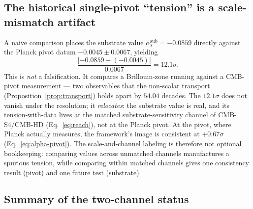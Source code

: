 \documentclass[12pt]{article}
\theoremstyle{definition}
\theoremstyle{remark}
\begin{document}
\subsection{The historical single-pivot ``tension'' is a scale-mismatch artifact}\label{sec:artifact}

A naive comparison places the substrate value $\alpha_s^{\mathrm{sub}} = -0.0859$ directly against the Planck pivot datum $-0.0045 \pm 0.0067$, yielding
\begin{equation}\label{eq:artifact}
  \frac{|-0.0859 - (-0.0045)|}{0.0067} = 12.1\sigma.
\end{equation}
This is \emph{not} a falsification. It compares a Brillouin-zone running against a CMB-pivot measurement --- two observables that the non-scalar transport (Proposition~\ref{prop:transport}) holds apart by $54.04$ decades. The $12.1\sigma$ does not vanish under the resolution; it \emph{relocates}: the substrate value is real, and its tension-with-data lives at the matched substrate-sensitivity channel of CMB-S4/CMB-HD (Eq.~\ref{eq:reach}), not at the Planck pivot. At the pivot, where Planck actually measures, the framework's image is consistent at $+0.67\sigma$ (Eq.~\ref{eq:alpha-pivot}). The scale-and-channel labeling is therefore not optional bookkeeping: comparing values across unmatched channels manufactures a spurious tension, while comparing within matched channels gives one consistency result (pivot) and one future test (substrate).

\subsection{Summary of the two-channel status}\label{sec:two-channel-summary}
\end{document}
